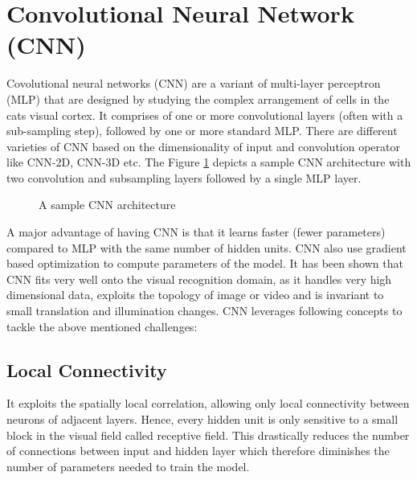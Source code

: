 \section{Convolutional Neural Network (CNN)}
 \label{sec:cnn}
 \par Covolutional neural networks (CNN) are a variant of multi-layer perceptron (MLP) that are designed by studying the complex arrangement of cells in the cats visual cortex.  It comprises of one or more convolutional layers (often with a sub-sampling step), followed by one or more standard MLP.  There are different varieties of CNN based on the dimensionality of input and convolution operator like CNN-2D, CNN-3D etc.  The Figure \ref{fig:cnnarchitecture} depicts a sample CNN architecture with two convolution and subsampling layers followed by a single MLP layer.
 
\begin{figure}[htpb]
   \begin{center}
   		{%
			\setlength{\fboxsep}{5pt}%
	    }%
     \caption[] {A sample CNN architecture \footnotemark}
	\label{fig:cnnarchitecture}  
   \end{center}
 \end{figure} 
\par A major advantage of having CNN is that it learns faster (fewer parameters) compared to MLP with the same number of hidden units.  CNN  also use  gradient based optimization to compute parameters of the model.  It has been shown that CNN fits very well onto the visual recognition domain, as it handles very high dimensional data, exploits the topology of image or video and is invariant to small translation and illumination changes.  CNN leverages following concepts to tackle the above mentioned challenges:
\subsection{Local Connectivity}
It exploits the spatially local correlation, allowing only local connectivity between neurons of adjacent layers.  Hence, every hidden unit is only sensitive to a small block in the visual field called receptive field. This drastically reduces the number of connections between input and hidden layer which therefore diminishes the number of parameters needed to train the model.
